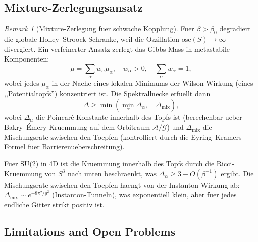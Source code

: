 \documentclass[12pt,a4paper]{article}
\theoremstyle{definition}
\theoremstyle{plain}
\theoremstyle{remark}
\newtheorem{remark}[definition]{Remark}
\begin{document}
\subsection{Mixture-Zerlegungsansatz}

\begin{remark}[Mixture-Zerlegung fuer schwache Kopplung]
\label{rem:mixture-decomposition}
Fuer $\beta > \beta_0$ degradiert die globale Holley--Stroock-Schranke, weil die Oszillation $\mathrm{osc}(S) \to \infty$ divergiert. Ein verfeinerter Ansatz zerlegt das Gibbs-Mass in metastabile Komponenten:
\[
\mu = \sum_{\alpha} w_\alpha \mu_\alpha, \quad w_\alpha > 0, \quad \sum_\alpha w_\alpha = 1,
\]
wobei jedes $\mu_\alpha$ in der Naehe eines lokalen Minimums der Wilson-Wirkung (eines ,,Potentialtopfs'') konzentriert ist. Die Spektralluecke erfuellt dann
\[
\Delta \geq \min\left( \min_\alpha \Delta_\alpha, \quad \Delta_{\mathrm{mix}} \right),
\]
wobei $\Delta_\alpha$ die Poincar\'e-Konstante innerhalb des Topfs ist (berechenbar ueber Bakry--\'Emery-Kruemmung auf dem Orbitraum $\mathcal{A}/\mathcal{G}$) und $\Delta_{\mathrm{mix}}$ die Mischungsrate zwischen den Toepfen (kontrolliert durch die Eyring--Kramers-Formel fuer Barrierenueberschreitung).

Fuer SU(2) in 4D ist die Kruemmung innerhalb des Topfs durch die Ricci-Kruemmung von $S^3$ nach unten beschraenkt, was $\Delta_\alpha \geq 3 - O(\beta^{-1})$ ergibt. Die Mischungsrate zwischen den Toepfen haengt von der Instanton-Wirkung ab: $\Delta_{\mathrm{mix}} \sim e^{-8\pi^2/g^2}$ (Instanton-Tunneln), was exponentiell klein, aber fuer jedes endliche Gitter strikt positiv ist.
\end{remark}

\subsection{Limitations and Open Problems}
\end{document}
